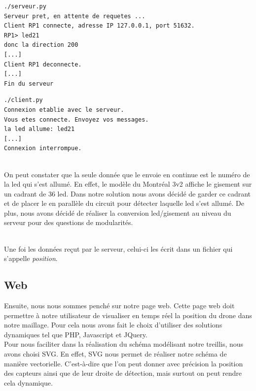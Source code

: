 \begin{minipage}[h]{0.45\linewidth}

\begin{lstlisting}
./serveur.py
Serveur pret, en attente de requetes ...
Client RP1 connecte, adresse IP 127.0.0.1, port 51632.
RP1> led21
donc la direction 200
[...]
Client RP1 deconnecte.
[...]
Fin du serveur
\end{lstlisting}  
\end{minipage}\hfill
\begin{minipage}[h]{0.45\linewidth}
  
\begin{lstlisting}
./client.py
Connexion etablie avec le serveur.
Vous etes connecte. Envoyez vos messages.
la led allume: led21
[...]
Connexion interrompue.
\end{lstlisting}

\end{minipage}

~\\

On peut constater que la seule donnée que le \rpi envoie en continue est le numéro de la led qui s'est allumé. En effet, le modèle du Montréal 3v2 affiche le gisement sur un cadrant de 36 led. Dans notre solution nous avons décidé de garder ce cadrant et de placer le \rpi en parallèle du circuit pour détecter laquelle led s'est allumé. De plus, nous avons décidé de réaliser la conversion led/gisement au niveau du serveur pour des questions de modularités. 

~\\

Une foi les données reçut par le serveur, celui-ci les écrit dans un fichier qui s'appelle \textit{position}.



\subsection{Web}

Ensuite, nous nous sommes penché sur notre page web. Cette page web doit permettre à notre utilisateur de visualiser en temps réel la position du drone dans notre maillage. Pour cela nous avons fait le choix d'utiliser des solutions dynamiques tel que PHP, Javascript et JQuery.
~\\

Pour nous faciliter dans la réalisation du schéma modélisant notre treillis, nous avons choisi SVG. En effet, SVG nous permet de réaliser notre schéma de manière vectorielle. C'est-à-dire que l'on peut donner avec précision la position des capteurs ainsi que de leur droite de détection, mais surtout on peut rendre cela dynamique.
~\\

